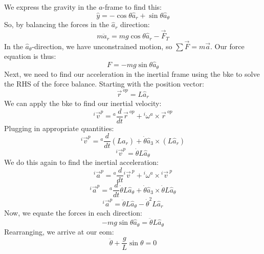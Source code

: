 \documentclass[10pt, openany, titlepage]{book}
\theoremstyle{definition}
\begin{document}
We express the gravity in the $a$-frame to find this:
$$\hat{y}=-\cos\theta\hat{a}_r+\sin\theta \hat{a}_\theta$$
So, by balancing the forces in the $\hat{a}_r$ direction:
$$m{\ddot{a}}_r=mg\cos\theta \hat{a}_r-\vec{F}_T$$
In the $\hat{a}_\theta$-direction, we have unconstrained motion, so $\sum\vec{F}=m\vec{a}$. Our force equation is thus: 
$$F=-mg\sin\theta\hat{a}_{\theta}$$
Next, we need to find our acceleration in the \gls{inertial frame} using the \gls{bke} to solve the RHS of the force balance. Starting with the position vector:
$$\vec{r}^{\ op}=L\hat{a}_r$$
We can apply the \gls{bke} to find our inertial velocity:
$${}^i\vec{v}^p={}^a\frac{d}{dt}\vec{r}^{\ op}+{}^i\omega^a\times\vec{r}^{\ op}$$
Plugging in appropriate quantities:
$${}^i\vec{v}^p={}^a\frac{d}{dt}(L\hat{a}_r)+\dot{\theta}\hat{a}_3\times(L\hat{a}_r)$$
$${}^i\vec{v}^p=\dot{\theta}L\hat{a}_\theta$$
We do this again to find the inertial acceleration:
$${}^i\vec{a}^p={}^a\frac{d}{dt}{}^i\vec{v}^{\ p}+{}^i\omega^a\times{}^i\vec{v}^{\ p}$$
$${}^i\vec{a}^p={}^a\frac{d}{dt}{}\dot{\theta}L\hat{a}_\theta+\dot{\theta}\hat{a}_3\times\dot{\theta}L\hat{a}_\theta$$
$${}^i\vec{a}^p=\ddot{\theta}L\hat{a}_\theta-\dot{\theta}^2L\hat{a}_r$$
Now, we equate the forces in each direction:
$$-mg\sin\theta\hat{a}_\theta=\ddot{\theta}L\hat{a}_\theta$$
Rearranging, we arrive at our \gls{eom}:
$$\ddot{\theta}+\frac{g}{L}\sin\theta=0$$
\end{document}
